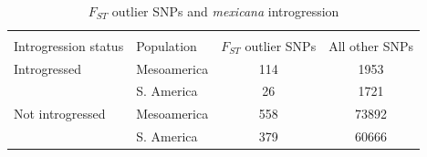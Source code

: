 \begin{table}[h]	
	\caption[]{$F_{ST}$ outlier SNPs and \emph{mexicana} introgression\hspace*{0.3cm}} 
			\centering
			\textbf{}\\[-2mm]
			{\fontsize{7}{11}\sf
		    \begin{tabular}{llcc} \hline\hline
		    & & \\[-3mm]
		    Introgression status & Population & $F_{ST}$ outlier SNPs & All other SNPs \\
		    \hline
		   Introgressed & Mesoamerica & 114 & 1953 \\
		 	& S. America & 26 & 1721 \\
		   Not introgressed & Mesoamerica & 558 & 73892 \\
		 	& S. America & 379 & 60666 \\
		      \hline\hline
		    \end{tabular}
		    \label{supp:introgressed}  %
		}
\end{table}



\newpage


